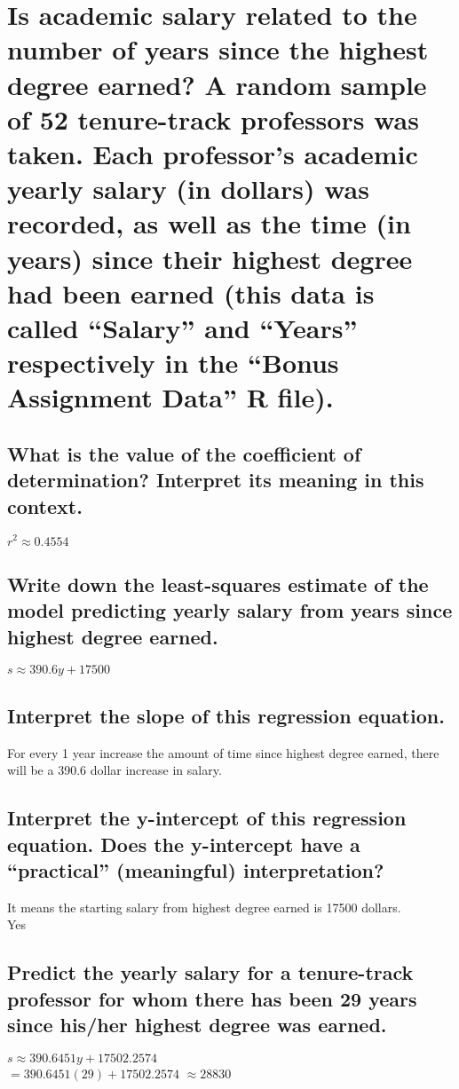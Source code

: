 \section{Is academic salary related to the number of years since the highest degree earned? A
    random sample of 52 tenure-track professors was taken. Each professor’s academic
    yearly salary (in dollars) was recorded, as well as the time (in years) since their highest
    degree had been earned (this data is called “Salary” and “Years” respectively in the
    “Bonus Assignment Data” R file).}
    \begin{multicols}{2}
        \subsection{What is the value of the coefficient of determination? Interpret its meaning in this
            context.}
            $r^2 \approx 0.4554$

        \subsection{Write down the least-squares estimate of the model predicting yearly salary from years
            since highest degree earned.}
            $s \approx 390.6y + 17500$

        \subsection{Interpret the slope of this regression equation.}
            For every 1 year increase the amount of time since highest degree earned, 
            there will be a 390.6 dollar increase in salary.

        \subsection{Interpret the y-intercept of this regression equation. Does the y-intercept have a
            “practical” (meaningful) interpretation?}
            It means the starting salary from highest degree earned is 17500 dollars.\\
            Yes

        \subsection{Predict the yearly salary for a tenure-track professor for whom there has been 29
            years since his/her highest degree was earned.}
            $s \approx 390.6451y + 17502.2574$\\
            $= 390.6451(29) + 17502.2574$
            $\approx 28830$


\end{multicols}
